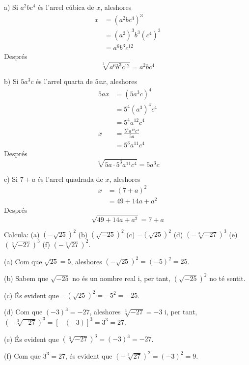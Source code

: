 \begin{solucio}
a) Si $a^{2}bc^{4}$ és l’arrel cúbica de $x$, aleshores 
\begin{align*}
x &=(a^{2}bc^{4})^{3} \\
&=(a^{2})^{3}b^{3}(c^{4})^{3} \\
&=a^{6}b^{3}c^{12}
\end{align*}%
Després%
\begin{equation*}
\sqrt[3]{a^{6}b^{3}c^{12}}=a^{2}bc^{4}
\end{equation*}

b) Si $5a^{3}c$ és l’arrel quarta de $5ax$, aleshores%
\begin{align*}
5ax &=(5a^{3}c)^{4} \\
&=5^{4}(a^{3})^{4}c^{4} \\
&=5^{4}a^{12}c^{4} \\
x &=\frac{5^{4}a^{12}c^{4}}{5a} \\
&=5^{3}a^{11}c^{4}
\end{align*}%
Després%
\begin{equation*}
\sqrt[4]{5a\cdot 5^{3}a^{11}c^{4}}=5a^{3}c
\end{equation*}

c) Si $7+a$ és l’arrel quadrada de $x$, aleshores%
\begin{align*}
x &=(7+a)^{2} \\
&=49+14a+a^{2}
\end{align*}%
Després%
\begin{equation*}
\sqrt{49+14a+a^{2}}=7+a
\end{equation*}
\end{solucio}

\begin{exercici}
Calcula: (a) $\left( -\sqrt{25}\right) ^{2}$ (b) $\left( \sqrt{-25}\right)
^{2}$ (c) $-\left( \sqrt{25}\right) ^{2}$ (d) $\left( -\sqrt[3]{-27}\right)
^{3}$ (e) $\left( \sqrt[3]{-27}\right) ^{3}$ (f) $\left( -\sqrt[3]{27}%
\right) ^{2}$.

\end{exercici}

\begin{solucio}
(a) Com que $\sqrt{25}=5$, aleshores $\left( -\sqrt{25}\right)
^{2}=(-5)^{2}=25$.

(b) Sabem que $\sqrt{-25}$ no és un nombre real i, per tant, $\left( 
\sqrt{-25}\right) ^{2}$ no té sentit.

(c) És evident que $-\left( \sqrt{25}\right) ^{2}=-5^{2}=-25$.

(d) Com que $(-3)^{3}=-27$, aleshores $\sqrt[3]{-27}=-3$ i, per tant, $%
\left( -\sqrt[3]{-27}\right) ^{3}=\left[ -(-3)\right] ^{3}=3^{3}=27$.

(e) És evident que $\left( \sqrt[3]{-27}\right) ^{3}=(-3)^{3}=-27$.

(f) Com que $3^{3}=27$, és evident que $\left( -\sqrt[3]{27}\right)
^{2}=(-3)^{2}=9$.
\end{solucio}

